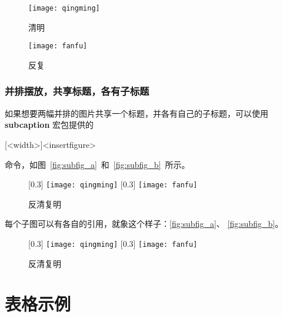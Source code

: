 \begin{figure}[htbp]
\centering
\begin{minipage}[t]{0.3\textwidth}
    \centering
    \texttt{[image: qingming]}
    \caption{清明}
    \label{fig:qingming}
\end{minipage}
\hspace{36pt}
\begin{minipage}[t]{0.3\textwidth}
    \centering
    \texttt{[image: fanfu]}
    \caption{反复}
    \label{fig:fanfu}
\end{minipage}
\end{figure}

\subsubsection*{并排摆放，共享标题，各有子标题}

如果想要两幅并排的图片共享一个标题，并各有自己的子标题，可以使用
\textbf{subcaption} 宏包提供的
\begin{latex}
[<width>]{<insertfigure>}
\end{latex}
命令，如图~\ref{fig:subfig_a}~和~\ref{fig:subfig_b}~所示。

\begin{latex}
\begin{figure}[htbp]
  \centering
  [0.3\textwidth]{
      \texttt{[image: qingming]}
  }
  \hspace{36pt}
  [0.3\textwidth]{
      \texttt{[image: fanfu]}
  }
  \caption{反清复明}
\end{figure}
\end{latex}

每个子图可以有各自的引用，就象这个样子：\ref{fig:subfig_a}、
\ref{fig:subfig_b}。

\begin{figure}[htbp]
\centering
{}[0.3\textwidth]{
    \texttt{[image: qingming]}
}
\hspace{36pt}
[0.3\textwidth]{
    \texttt{[image: fanfu]}
}
\caption{反清复明}
\end{figure}

\section{表格示例}
\label{sec:table}

